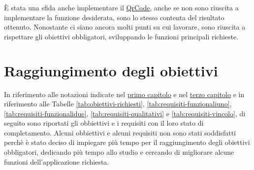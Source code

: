 È stata una sfida anche implementare il \hyperref[sec:qrcode]{QrCode}, anche se non sono riuscita a implementare la funzione desiderata, sono lo stesso contenta del risultato ottenuto.\newline
\newline
Nonostante ci siano ancora molti punti su cui lavorare, sono riuscita a rispettare gli obiettivi obbligatori, sviluppando le funzioni principali richieste.\newline

\section{Raggiungimento degli obiettivi}

In riferimento alle notazioni indicate nel \hyperref[sec:obbiettivi]{primo capitolo} e nel \hyperref[sec:requisiti]{terzo capitolo} e in riferimento alle Tabelle \ref{tab:obiettivi-richiesti}, \ref{tab:requisiti-funzionaliuno}, \ref{tab:requisiti-funzionalidue}, \ref{tab:requisiti-qualitativi} e \ref{tab:requisiti-vincolo}, di seguito sono riportati gli obbiettivi e i requisiti con il loro stato di completamento.\newline
Alcuni obbiettivi e alcuni requisiti non sono stati soddisfatti perchè è stato deciso di impiegare più tempo per il raggiungimento degli obiettivi obbligatori, dedicando più tempo allo studio e cercando di migliorare alcune funzioni dell'applicazione richiesta.\newline

